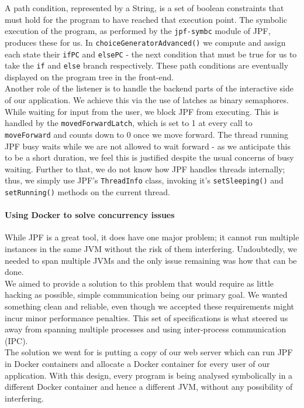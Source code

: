 \documentclass[titlepage,11pt]{article}
\begin{document}
A path condition, represented by a String, is a set of boolean constraints that must hold for the program to have reached that execution point. The symbolic execution of the program, as performed by the \texttt{jpf-symbc} module of JPF, produces these for us. In \texttt{choiceGeneratorAdvanced()} we compute and assign each state their \texttt{ifPC} and \texttt{elsePC} - the next condition that must be true for us to take the \texttt{if} and \texttt{else} branch respectively. These path conditions are eventually displayed on the program tree in the front-end. \\

Another role of the listener is to handle the backend parts of the interactive side of our application. We achieve this via the use of latches as binary semaphores. While waiting for input from the user, we block JPF from executing. This is handled by the \texttt{movedForwardLatch}, which is set to 1 at every call to \texttt{moveForward} and counts down to 0 once we move forward. The thread running JPF busy waits while we are not allowed to wait forward - as we anticipate this to be a short duration, we feel this is justified despite the usual concerns of busy waiting. Further to that, we do not know how JPF handles threads internally; thus, we simply use JPF's \texttt{ThreadInfo} class, invoking it's \texttt{setSleeping()} and \texttt{setRunning()} methods on the current thread.

\paragraph{Using Docker to solve concurrency issues}

While JPF is a great tool, it does have one major problem; it cannot run multiple instances in the same JVM without the risk of them interfering. Undoubtedly, we needed to span multiple JVMs and the only issue remaining was how that can be done. \\

We aimed to provide a solution to this problem that would require as little hacking as possible, simple communication being our primary goal. We wanted something clean and reliable, even though we accepted these requirements might incur minor performance penalties. This set of specifications is what steered us away from spanning multiple processes and using inter-process communication (IPC). \\

The solution we went for is putting a copy of our web server which can run JPF in Docker \cite{docker} containers and allocate a Docker container for every user of our application. With this design, every program is being analysed symbolically in a different Docker container and hence a different JVM, without any possibility of interfering. \\
\end{document}
